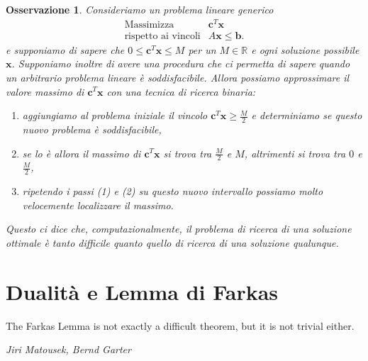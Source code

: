 \documentclass[italian, letter paper, 12pt, reqno]{article}
\theoremstyle{myteo}
\newtheorem{remark}[theorem]{Osservazione}
\numberwithin{equation}{section}
\begin{document}
\begin{remark}
  \label{oss:binary_search}
  Consideriamo un problema lineare generico
  \begin{equation*}
    \begin{array}{ll}
      \text{Massimizza} & \mathbf{c}^T\mathbf{x}\\
      \text{rispetto ai vincoli} & A\mathbf{x}\leq\mathbf{b}.
    \end{array}
  \end{equation*}
  e supponiamo di sapere che \(0\leq \mathbf{c}^T\mathbf{x}\leq M\) per un \(M\in\mathbb{R}\) e ogni soluzione possibile \(\mathbf{x}\).
  Supponiamo inoltre di avere una procedura che ci permetta di sapere quando un arbitrario problema lineare è soddisfacibile.
  Allora possiamo approssimare il valore massimo di \(\mathbf{c}^T\mathbf{x}\) con una tecnica di ricerca binaria:
  \begin{enumerate}
  \item aggiungiamo al problema iniziale il vincolo \(\mathbf{c}^T\mathbf{x}\geq \frac{M}{2}\) e determiniamo se questo nuovo problema è soddisfacibile,
  \item se lo è allora il massimo di \(\mathbf{c}^T\mathbf{x}\) si trova tra \(\frac{M}{2}\) e \(M\), altrimenti si trova tra \(0\) e \(\frac{M}{2}\),
  \item ripetendo i passi (1) e (2) su questo nuovo intervallo possiamo molto velocemente localizzare il massimo.
  \end{enumerate}
  Questo ci dice che, computazionalmente, il problema di ricerca di una soluzione ottimale è tanto difficile quanto quello di ricerca di una soluzione qualunque.
\end{remark}

\section{Dualità e Lemma di Farkas}
\label{sec:dualità_e_lemma_di_farkas}
\epigraph{The Farkas Lemma is not exactly a difficult theorem, but it is not trivial either.}{\textit{Jiri Matousek, Bernd Garter}}
\end{document}
